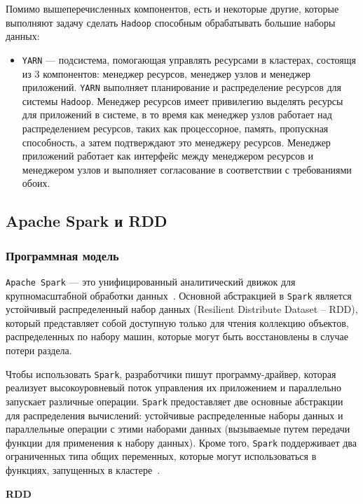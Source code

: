 Помимо вышеперечисленных компонентов, есть и некоторые другие, которые выполняют задачу сделать \texttt{Hadoop} способным обрабатывать большие наборы данных:
\begin{itemize}
  \item \texttt{YARN} --- подсистема, помогающая управлять ресурсами в кластерах, состоящя из 3 компонентов: менеджер ресурсов, менеджер узлов и менеджер приложений. 
    \texttt{YARN} выполняет планирование и распределение ресурсов для системы \texttt{Hadoop}.
    Менеджер ресурсов имеет привилегию выделять ресурсы для приложений в системе, в то время как менеджер узлов работает над распределением ресурсов, таких как процессорное, память, пропускная способность, а затем подтверждают это менеджеру ресурсов.
    Менеджер приложений работает как интерфейс между менеджером ресурсов и менеджером узлов и выполняет согласование в соответствии с требованиями обоих.
\end{itemize}


\subsection{Apache Spark и RDD}

\subsubsection{Программная модель}

\texttt{Apache Spark} --- это унифицированный аналитический движок для крупномасштабной обработки данных~\cite{apache-spark}.
Основной абстракцией в \texttt{Spark} является устойчивый распределенный набор данных (Resilient Distribute Dataset -- RDD), который представляет собой доступную только для чтения коллекцию объектов, распределенных по набору машин, которые могут быть восстановлены в случае потери раздела.

Чтобы использовать \texttt{Spark}, разработчики пишут программу-драйвер, которая реализует высокоуровневый поток управления их приложением и параллельно запускает различные операции. 
\texttt{Spark} предоставляет две основные абстракции для распределения вычислений: устойчивые распределенные наборы данных и параллельные операции с этими наборами данных (вызываемые путем передачи функции для применения к набору данных).
Кроме того, \texttt{Spark} поддерживает два ограниченных типа общих переменных, которые могут использоваться в функциях, запущенных в кластере~\cite{180560}.

\textbf{RDD}

